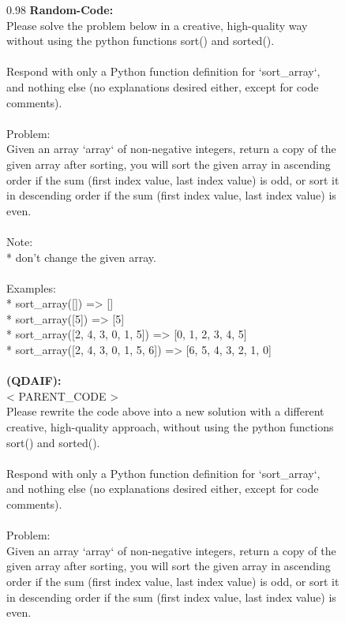 \begin{figure}[ht]
\centering
\begin{boxedminipage}{0.98\textwidth}
\textbf{Random-Code:}\\
Please solve the problem below in a creative, high-quality way without using the python functions sort() and sorted(). \\
\\
Respond with only a Python function definition for `sort\_array`, and nothing else (no explanations desired either, except for code comments).\\
\\
Problem:\\
Given an array `array` of non-negative integers, return a copy of the given array after sorting, you will sort the given array in ascending order if the sum (first index value, last index value) is odd, or sort it in descending order if the sum (first index value, last index value) is even.\\
\\
Note:\\
* don't change the given array.\\
\\
Examples:\\
* sort\_array([]) =\textgreater{} []\\
* sort\_array([5]) =\textgreater{} [5]\\
* sort\_array([2, 4, 3, 0, 1, 5]) =\textgreater{} [0, 1, 2, 3, 4, 5]\\
* sort\_array([2, 4, 3, 0, 1, 5, 6]) =\textgreater{} [6, 5, 4, 3, 2, 1, 0]\\
\\
\textbf{\qdaifrewrite{} (QDAIF):}\\
\textless{} PARENT\_CODE \textgreater{}\\
Please rewrite the code above into a new solution with a different creative, high-quality approach, without using the python functions sort() and sorted().\\
\\
Respond with only a Python function definition for `sort\_array`, and nothing else (no explanations desired either, except for code comments).\\
\\
Problem:\\
Given an array `array` of non-negative integers, return a copy of the given array after sorting, you will sort the given array in ascending order if the sum (first index value, last index value) is odd, or sort it in descending order if the sum (first index value, last index value) is even.\\

\end{boxedminipage}
\end{figure}
